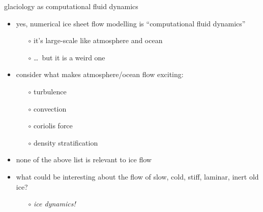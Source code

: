 \documentclass[10pt]{beamer}
\begin{document}
\begin{frame}{glaciology as computational fluid dynamics}

\begin{itemize}
\item \alert{yes}, numerical ice sheet flow modelling is ``computational fluid dynamics''
  \begin{itemize}
  \item[$\circ$] it's large-scale like atmosphere and ocean
  \item[$\circ$] \dots\, but it is a weird one
  \end{itemize}
\item consider what makes atmosphere/ocean flow exciting:
  \begin{itemize}
  \item[$\circ$] turbulence
  \item[$\circ$] convection
  \item[$\circ$] coriolis force
  \item[$\circ$] density stratification
  \end{itemize}
\item none of the above list is relevant to ice flow
\item what could be interesting about the flow of slow, cold, stiff, laminar, inert old ice?
  \begin{itemize}
  \item[$\circ$] \emph{ice dynamics!}
  \end{itemize}
\end{itemize}
\end{frame}
\end{document}
